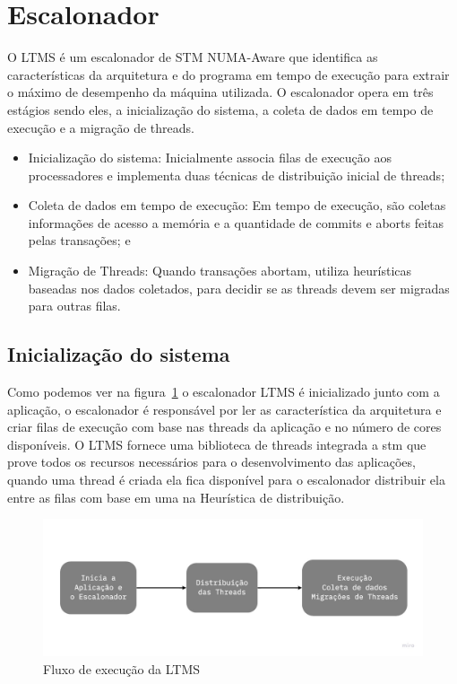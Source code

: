 \documentclass[diss,capa]{texufpel}
\begin{document}
\section{\textbf{Escalonador}}

O LTMS é um escalonador de STM NUMA-Aware que identifica as características da arquitetura e do programa em tempo de execução para extrair o máximo de desempenho da máquina utilizada. O escalonador opera em três estágios sendo eles, a inicialização do sistema, a coleta de dados em tempo de execução e a migração de threads.

\begin{itemize}
  \item Inicialização do sistema: Inicialmente associa filas de execução aos processadores e implementa duas técnicas de distribuição inicial de threads;
  \item Coleta de dados em tempo de execução: Em tempo de execução, são coletas informações de acesso a memória e a quantidade de commits e aborts feitas pelas transações; e
  \item Migração de Threads: Quando transações abortam, utiliza heurísticas baseadas nos dados coletados, para decidir se as threads devem ser migradas para outras filas.
\end{itemize}


\subsection{Inicialização do sistema}
\label{inicializacao}

Como podemos ver na figura~\ref{ltms_generic} o escalonador LTMS é inicializado junto com a aplicação, o escalonador é responsável por ler as característica da arquitetura e criar filas de execução com base nas threads da aplicação e no número de cores disponíveis. O LTMS fornece uma biblioteca de threads integrada a stm que prove todos os recursos necessários para o desenvolvimento das aplicações, quando uma thread é criada ela fica disponível para o escalonador distribuir ela entre as filas com base em uma na Heurística de distribuição.

\begin{figure}[htbp]
  \centering \includegraphics[scale=.25]{images/ltms_generic}
\caption{Fluxo de execução da LTMS} 
\label{ltms_generic}
\end{figure}
\end{document}
